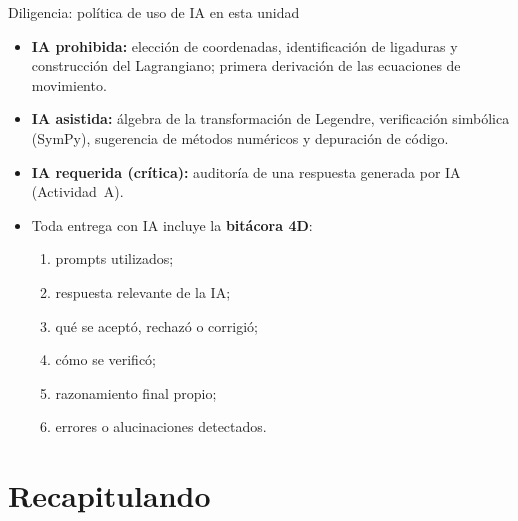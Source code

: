 \documentclass[spanish]{beamer}
\begin{document}
\begin{frame}{\alert{Diligencia}: política de uso de IA en esta unidad}
\begin{itemize}[<+->]
  \item \textbf{IA prohibida:} elección de coordenadas, identificación de ligaduras y
        construcción del Lagrangiano; primera derivación de las ecuaciones de movimiento.
  \item \textbf{IA asistida:} álgebra de la transformación de Legendre, verificación
        simbólica (SymPy), sugerencia de métodos numéricos y depuración de código.
  \item \textbf{IA requerida (crítica):} auditoría de una respuesta generada por IA
        (Actividad~A).
  \item Toda entrega con IA incluye la \textbf{bitácora 4D}:
        \begin{enumerate}
          \item prompts utilizados;
          \item respuesta relevante de la IA;
          \item qué se aceptó, rechazó o corrigió;
          \item cómo se verificó;
          \item razonamiento final propio;
          \item errores o alucinaciones detectados.
        \end{enumerate}
\end{itemize}
\end{frame}

\section{Recapitulando}
\end{document}
